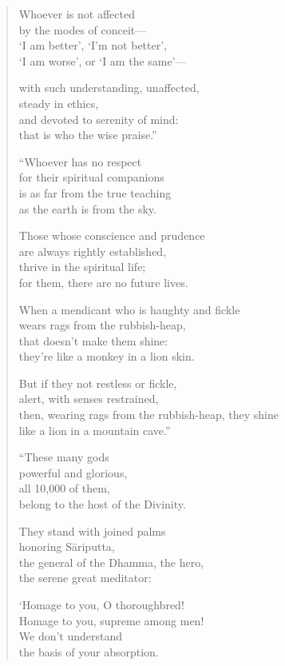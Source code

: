 \documentclass[12pt,openany]{book}%
\begin{document}
\begin{verse}
Whoever is not affected \\
by the modes of conceit—\\
‘I am better’, ‘I’m not better’, \\
‘I am worse’, or ‘I am the same’—

with such understanding, unaffected, \\
steady in ethics, \\
and devoted to serenity of mind: \\
that is who the wise praise.” 

“Whoever has no respect \\
for their spiritual companions \\
is as far from the true teaching \\
as the earth is from the sky. 

Those whose conscience and prudence \\
are always rightly established, \\
thrive in the spiritual life; \\
for them, there are no future lives. 

When a mendicant who is haughty and fickle \\
wears rags from the rubbish-heap, \\
that doesn’t make them shine: \\
they’re like a monkey in a lion skin. 

But if they not restless or fickle, \\
alert, with senses restrained, \\
then, wearing rags from the rubbish-heap, they shine \\
like a lion in a mountain cave.” 

“These many gods \\
powerful and glorious, \\
all 10,000 of them, \\
belong to the host of the Divinity. 

They stand with joined palms \\
honoring \textsanskrit{Sāriputta}, \\
the general of the Dhamma, the hero, \\
the serene great meditator: 

‘Homage to you, O thoroughbred! \\
Homage to you, supreme among men! \\
We don’t understand \\
the basis of your absorption. 


\end{verse}
\end{document}
